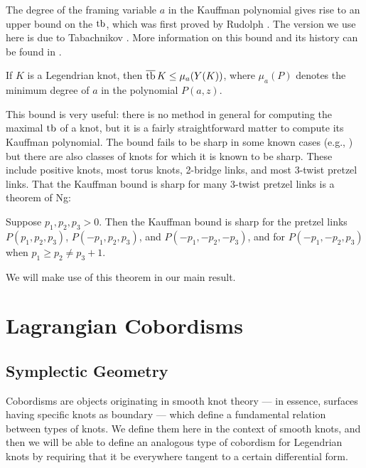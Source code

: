 The degree of the framing variable $a$ in the Kauffman polynomial gives rise to an upper bound on the $\operatorname{tb}$, which was first proved by Rudolph \cite{rudolph}. The version we use here is due to Tabachnikov \cite{tabachnikov}. More information on this bound and its history can be found in \cite{ferrand}.

\begin{theorem}\label{kauffman-bound}
    If $K$ is a Legendrian knot, then $\overline{\operatorname{tb}}\, K \leq \mu_a(Y(K))$, where $\mu_a(P)$ denotes the minimum degree of $a$ in the polynomial $P(a, z)$.
\end{theorem}

This bound is very useful: there is no method in general for computing the maximal $\operatorname{tb}$ of a knot, but it is a fairly straightforward matter to compute its Kauffman polynomial. The bound fails to be sharp in some known cases (e.g., \cite{ferrand}) but there are also classes of knots for which it is known to be sharp. These include positive knots, most torus knots, 2-bridge links, and most 3-twist pretzel links. That the Kauffman bound is sharp for many 3-twist pretzel links is a theorem of Ng:

\begin{theorem}[\cite{ng}]\label{thm:ng}
    Suppose $p_1, p_2, p_3 > 0$. Then the Kauffman bound is sharp for the pretzel links $P(p_1, p_2, p_3)$, $P(-p_1, p_2, p_3)$, and $P(-p_1, -p_2, -p_3)$, and for $P(-p_1, -p_2, p_3)$ when $p_1 \geq p_2 \neq p_3 + 1$.
\end{theorem}

We will make use of this theorem in our main result.

\section{Lagrangian Cobordisms}\label{sec:cobordisms}

\subsection{Symplectic Geometry}\label{subsec:symplectic}

Cobordisms are objects originating in smooth knot theory --- in essence, surfaces having specific knots as boundary --- which define a fundamental relation between types of knots. We define them here in the context of smooth knots, and then we will be able to define an analogous type of cobordism for Legendrian knots by requiring that it be everywhere tangent to a certain differential form.

